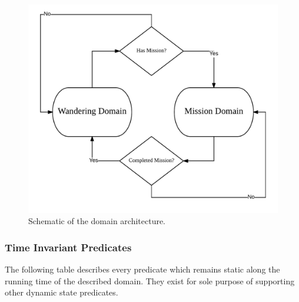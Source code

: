 \begin{figure}[H]
    \centering
        \includegraphics[scale=0.2]{images/domain_arch}
        \caption{Schematic of the domain architecture.}
        \label{fig:domain_arch}
\end{figure}

\subsubsection{Time Invariant Predicates}

The following table describes every predicate which remains static along the running 
time of the described domain. They exist for sole purpose of supporting other 
dynamic state predicates.


